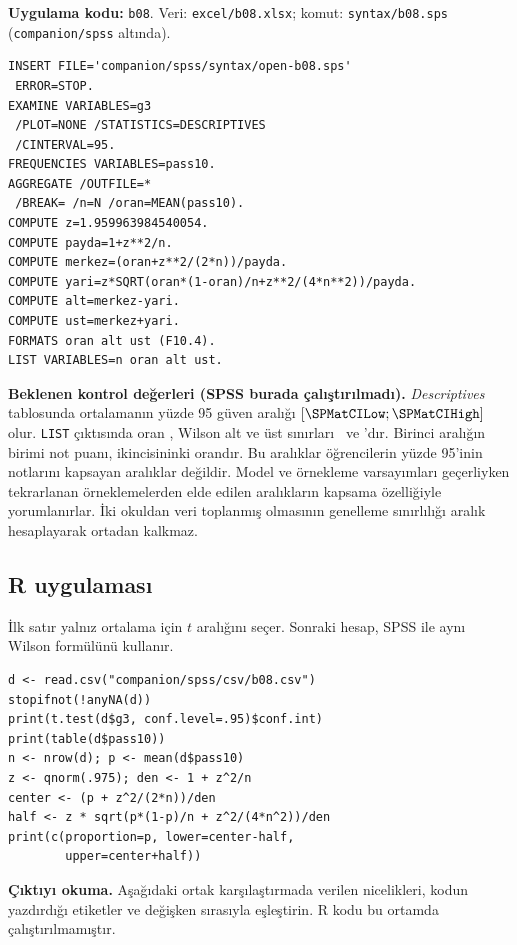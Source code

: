 \par\noindent\begin{minipage}{\linewidth}
\textbf{Uygulama kodu:} \texttt{b08}. Veri: \texttt{excel/b08.xlsx};
komut: \texttt{syntax/b08.sps} (\texttt{companion/spss} altında).

\begin{lstlisting}[style=prismSPSS]
INSERT FILE='companion/spss/syntax/open-b08.sps'
 ERROR=STOP.
EXAMINE VARIABLES=g3
 /PLOT=NONE /STATISTICS=DESCRIPTIVES
 /CINTERVAL=95.
FREQUENCIES VARIABLES=pass10.
AGGREGATE /OUTFILE=*
 /BREAK= /n=N /oran=MEAN(pass10).
COMPUTE z=1.959963984540054.
COMPUTE payda=1+z**2/n.
COMPUTE merkez=(oran+z**2/(2*n))/payda.
COMPUTE yari=z*SQRT(oran*(1-oran)/n+z**2/(4*n**2))/payda.
COMPUTE alt=merkez-yari.
COMPUTE ust=merkez+yari.
FORMATS oran alt ust (F10.4).
LIST VARIABLES=n oran alt ust.
\end{lstlisting}

\end{minipage}\par

\begin{outputguidebox}
\textbf{Beklenen kontrol değerleri (SPSS burada çalıştırılmadı).}
\emph{Descriptives} tablosunda ortalamanın yüzde 95 güven aralığı
$[\SPMatCILow;\SPMatCIHigh]$ olur. \texttt{LIST} çıktısında oran
\SPMatPHat, Wilson alt ve üst sınırları \SPWilsonLow\ ve \SPWilsonHigh'dır.
Birinci aralığın birimi not puanı, ikincisininki orandır.
Bu aralıklar öğrencilerin yüzde 95'inin notlarını kapsayan aralıklar değildir.
Model ve örnekleme varsayımları geçerliyken tekrarlanan örneklemelerden elde
edilen aralıkların kapsama özelliğiyle yorumlanırlar. İki okuldan veri
toplanmış olmasının genelleme sınırlılığı aralık hesaplayarak ortadan kalkmaz.
\end{outputguidebox}


\par\noindent\begin{minipage}{\linewidth}
\subsection{R uygulaması}
\label{sec:r-gercek-b08}

İlk satır yalnız ortalama için $t$ aralığını seçer. Sonraki hesap, SPSS ile aynı Wilson formülünü kullanır.

\begin{lstlisting}[style=prismR]
d <- read.csv("companion/spss/csv/b08.csv")
stopifnot(!anyNA(d))
print(t.test(d$g3, conf.level=.95)$conf.int)
print(table(d$pass10))
n <- nrow(d); p <- mean(d$pass10)
z <- qnorm(.975); den <- 1 + z^2/n
center <- (p + z^2/(2*n))/den
half <- z * sqrt(p*(1-p)/n + z^2/(4*n^2))/den
print(c(proportion=p, lower=center-half,
        upper=center+half))
\end{lstlisting}

\textbf{Çıktıyı okuma.} Aşağıdaki ortak karşılaştırmada verilen nicelikleri, kodun yazdırdığı etiketler ve değişken sırasıyla eşleştirin. R kodu bu ortamda çalıştırılmamıştır.
\end{minipage}\par

